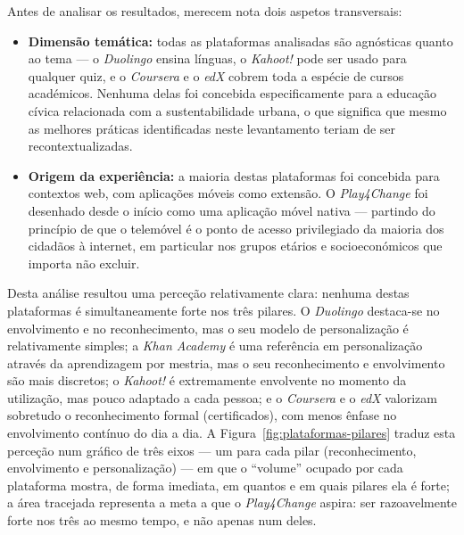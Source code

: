 Antes de analisar os resultados, merecem nota dois aspetos transversais:

\begin{itemize}
    \item \textbf{Dimensão temática:} todas as plataformas analisadas são agnósticas quanto ao tema --- o \emph{Duolingo} ensina línguas, o \emph{Kahoot!} pode ser usado para qualquer quiz, e o \emph{Coursera} e o \emph{edX} cobrem toda a espécie de cursos académicos. Nenhuma delas foi concebida especificamente para a educação cívica relacionada com a sustentabilidade urbana, o que significa que mesmo as melhores práticas identificadas neste levantamento teriam de ser recontextualizadas.
    \item \textbf{Origem da experiência:} a maioria destas plataformas foi concebida para contextos web, com aplicações móveis como extensão. O \emph{Play4Change} foi desenhado desde o início como uma aplicação móvel nativa --- partindo do princípio de que o telemóvel é o ponto de acesso privilegiado da maioria dos cidadãos à internet, em particular nos grupos etários e socioeconómicos que importa não excluir.
\end{itemize}

Desta análise resultou uma perceção relativamente clara: nenhuma destas plataformas é simultaneamente forte nos três pilares. O \emph{Duolingo} destaca-se no envolvimento e no reconhecimento, mas o seu modelo de personalização é relativamente simples; a \emph{Khan Academy} é uma referência em personalização através da aprendizagem por mestria, mas o seu reconhecimento e envolvimento são mais discretos; o \emph{Kahoot!} é extremamente envolvente no momento da utilização, mas pouco adaptado a cada pessoa; e o \emph{Coursera} e o \emph{edX} valorizam sobretudo o reconhecimento formal (certificados), com menos ênfase no envolvimento contínuo do dia a dia. A Figura~\ref{fig:plataformas-pilares} traduz esta perceção num gráfico de três eixos --- um para cada pilar (reconhecimento, envolvimento e personalização) --- em que o ``volume'' ocupado por cada plataforma mostra, de forma imediata, em quantos e em quais pilares ela é forte; a área tracejada representa a meta a que o \emph{Play4Change} aspira: ser razoavelmente forte nos três ao mesmo tempo, e não apenas num deles.

